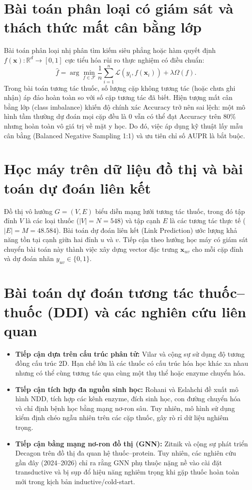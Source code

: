 \documentclass[12pt,a4paper,oneside]{report}
\begin{document}
\section{Bài toán phân loại có giám sát và thách thức mất cân bằng lớp}
Bài toán phân loại nhị phân tìm kiếm siêu phẳng hoặc hàm quyết định $f(\mathbf{x}): \mathbb{R}^d \rightarrow [0, 1]$ cực tiểu hóa rủi ro thực nghiệm có điều chuẩn:
\begin{equation}
  \hat{f} = \arg\min_{f \in \mathcal{F}} \frac{1}{n}\sum_{i=1}^{n} \mathcal{L}(y_i, f(\mathbf{x}_i)) + \lambda \Omega(f).
\end{equation}
Trong bài toán tương tác thuốc, số lượng cặp không tương tác (hoặc chưa ghi nhận) áp đảo hoàn toàn so với số cặp tương tác đã biết. Hiện tượng mất cân bằng lớp (class imbalance) khiến độ chính xác Accuracy trở nên sai lệch: một mô hình tầm thường dự đoán mọi cặp đều là 0 vẫn có thể đạt Accuracy trên 80\% nhưng hoàn toàn vô giá trị về mặt y học. Do đó, việc áp dụng kỹ thuật lấy mẫu cân bằng (Balanced Negative Sampling 1:1) và ưu tiên chỉ số AUPR là bắt buộc.

\section{Học máy trên dữ liệu đồ thị và bài toán dự đoán liên kết}
Đồ thị vô hướng $G = (V, E)$ biểu diễn mạng lưới tương tác thuốc, trong đó tập đỉnh $V$ là các loại thuốc ($|V| = N = 548$) và tập cạnh $E$ là các tương tác thực tế ($|E| = M = 48.584$). Bài toán dự đoán liên kết (Link Prediction) ước lượng khả năng tồn tại cạnh giữa hai đỉnh $u$ và $v$. Tiếp cận theo hướng học máy có giám sát chuyển bài toán này thành việc xây dựng vector đặc trưng $\mathbf{x}_{uv}$ cho mỗi cặp đỉnh và dự đoán nhãn $y_{uv} \in \{0, 1\}$.

\section{Bài toán dự đoán tương tác thuốc--thuốc (DDI) và các nghiên cứu liên quan}
\begin{itemize}
  \item \textbf{Tiếp cận dựa trên cấu trúc phân tử:} Vilar và cộng sự \cite{vilar2014} sử dụng độ tương đồng cấu trúc 2D. Hạn chế lớn là các thuốc có cấu trúc hóa học khác xa nhau nhưng có thể cùng tương tác qua cùng một thụ thể hoặc enzyme chuyển hóa.
  \item \textbf{Tiếp cận tích hợp đa nguồn sinh học:} Rohani và Eslahchi \cite{rohani2019} đề xuất mô hình NDD, tích hợp các kênh enzyme, đích sinh học, con đường chuyển hóa và chỉ định bệnh học bằng mạng nơ-ron sâu. Tuy nhiên, mô hình sử dụng kiểm định chéo ngẫu nhiên trên các cặp thuốc, gây rò rỉ dữ liệu nghiêm trọng.
  \item \textbf{Tiếp cận bằng mạng nơ-ron đồ thị (GNN):} Zitnik và cộng sự \cite{zitnik2018} phát triển Decagon trên đồ thị đa quan hệ thuốc--protein. Tuy nhiên, các nghiên cứu gần đây (2024--2026) \cite{langground2026, fgddi2026, mrlfddi2026} chỉ ra rằng GNN phụ thuộc nặng nề vào cài đặt transductive và bị sụp đổ hiệu năng nghiêm trọng khi gặp thuốc hoàn toàn mới trong kịch bản inductive/cold-start.
\end{itemize}
\end{document}
